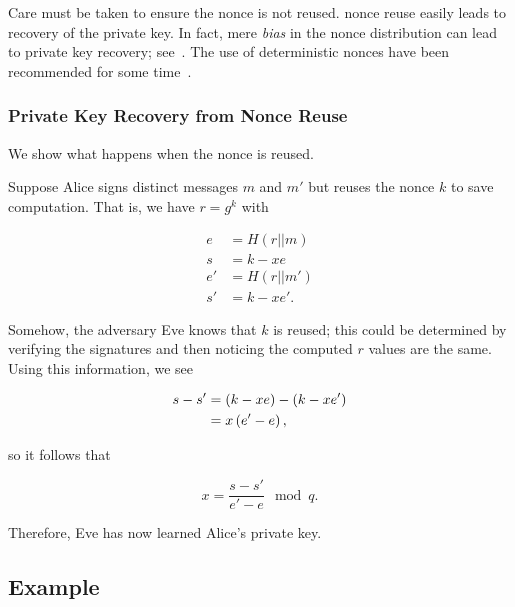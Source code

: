 Care must be taken to ensure the \gls{nonce} is not reused.
\Gls{nonce} reuse easily leads to recovery of the private key.
In fact, mere \emph{bias} in the \gls{nonce} distribution
can lead to private key recovery;
see~\cite{cryptoeprint:2019:023}.
The use of deterministic \glspl{nonce} have been recommended
for some time~\cite{rfc6979}.

\subsubsection{Private Key Recovery from Nonce Reuse}

We show what happens when the \gls{nonce} is reused.

Suppose Alice signs distinct messages $m$ and $m'$
but reuses the \gls{nonce} $k$ to save computation.
That is, we have $r = g^{k}$ with

\begin{align}
    e &= H(r||m) \nonumber\\
    s &= k - xe \nonumber\\
    e' &= H(r||m') \nonumber\\
    s' &= k - xe'.
\end{align}

\noindent
Somehow, the adversary Eve knows that $k$ is reused;
this could be determined by verifying the signatures
and then noticing the computed $r$ values are the same.
Using this information, we see

\begin{align}
    s - s' &= \left( k - xe \right) - \left( k - xe' \right) \nonumber\\
        &= x\left( e'-e \right),
\end{align}

\noindent
so it follows that

\begin{equation}
    x = \frac{s-s'}{e'-e} \mod q.
\end{equation}

\noindent
Therefore, Eve has now learned Alice's private key.

\subsection{Example}

